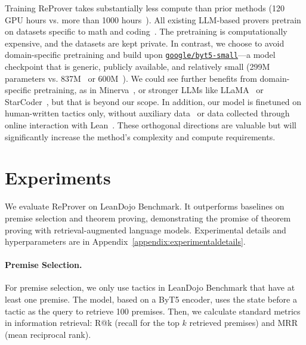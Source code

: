 \documentclass{article}
\newcommand{\smallsec}[1]{\vspace{-1mm} \paragraph{#1.}}
\newcommand\name{ReProver}
\begin{document}
Training {\name} takes substantially less compute than prior methods (120 GPU hours vs. more than 1000 hours~\cite{han2022proof,lample2022hypertree}). All existing LLM-based provers pretrain on datasets specific to math and coding~\cite{polu2020generative,jiang2021lisa,han2022proof,lample2022hypertree,jiang2022thor,polu2023formal,first2023baldur}. The pretraining is computationally expensive, and the datasets are kept private. In contrast, we choose to avoid domain-specific pretraining and build upon \href{https://huggingface.co/google/byt5-small}{\texttt{google/byt5-small}}---a model checkpoint that is generic, publicly available, and relatively small (299M parameters vs. 837M~\cite{han2022proof} or 600M~\cite{lample2022hypertree}). We could see further benefits from domain-specific pretraining, as in Minerva~\cite{lewkowycz2022solving}, or stronger LLMs like LLaMA~\cite{touvron2023llama} or StarCoder~\cite{li2023starcoder}, but that is beyond our scope. In addition, our model is finetuned on human-written tactics only, without auxiliary data~\cite{han2022proof} or data collected through online interaction with Lean~\cite{polu2023formal,lample2022hypertree}. These orthogonal directions are valuable but will significantly increase the method's complexity and compute requirements.




\section{Experiments}
\label{sec:experiments}

We evaluate {\name} on LeanDojo Benchmark. It outperforms baselines on premise selection and theorem proving, demonstrating the promise of theorem proving with retrieval-augmented language models. Experimental details and hyperparameters are in Appendix~\ref{appendix:experimentaldetails}.



\smallsec{Premise Selection}
For premise selection, we only use tactics in LeanDojo Benchmark that have at least one premise. The model, based on a ByT5 encoder, uses the state before a tactic as the query to retrieve 100 premises. Then, we calculate standard metrics in information retrieval: R@k (recall for the top $k$ retrieved premises) and MRR (mean reciprocal rank). 
\end{document}
